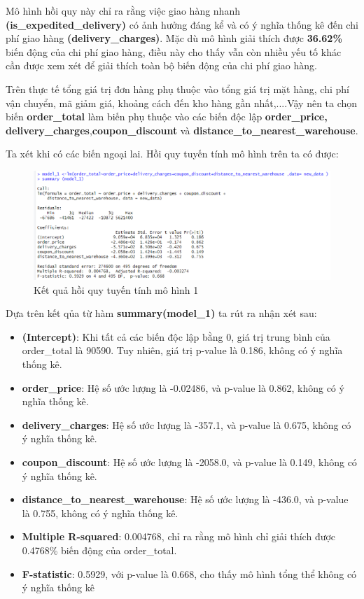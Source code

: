  Mô hình hồi quy này chỉ ra rằng việc giao hàng nhanh \textbf{(is\_expedited\_delivery)} có ảnh hưởng đáng kể và có ý nghĩa thống kê đến chi phí giao hàng \textbf{(delivery\_charges)}. Mặc dù mô hình giải thích được \textbf{36.62\%} biến động của chi phí giao hàng, điều này cho thấy vẫn còn nhiều yếu tố khác cần được xem xét để giải thích toàn bộ biến động của chi phí giao hàng.

Trên thực tế tổng giá trị đơn hàng phụ thuộc vào tổng giá trị mặt hàng, chi phí vận chuyển, mã giảm giá, khoảng cách đến kho hàng gần nhất,....Vậy nên ta chọn biến \textbf{order\_total} làm biến phụ thuộc vào các biến độc lập \textbf{order\_price, delivery\_charges},\textbf{coupon\_discount} và \textbf{distance\_to\_nearest\_warehouse}.

Ta xét khi có các biến ngoại lai. Hồi quy tuyến tính mô hình trên ta có được:
\begin{figure}[H]
  \centering
  \includegraphics[width=0.7\linewidth]{graphics/5.5.2.png}
  \caption{Kết quả hồi quy tuyến tính mô hình 1 }
\end{figure}

Dựa trên kết qủa từ hàm \textbf{summary(model\_1)} ta rút ra nhận xét sau:
\begin{itemize}
\item \textbf{(Intercept)}: Khi tất cả các biến độc lập bằng 0, giá trị trung bình của order\_total là 90590. Tuy nhiên, giá trị p-value là 0.186, không có ý nghĩa thống kê.
\item \textbf{order\_price}: Hệ số ước lượng là -0.02486, và p-value là 0.862, không có ý nghĩa thống kê.
\item \textbf{delivery\_charges}: Hệ số ước lượng là -357.1, và p-value là 0.675, không có ý nghĩa thống kê.
\item \textbf{coupon\_discount}: Hệ số ước lượng là -2058.0, và p-value là 0.149, không có ý nghĩa thống kê.
\item \textbf{distance\_to\_nearest\_warehouse}: Hệ số ước lượng là -436.0, và p-value là 0.755, không có ý nghĩa thống kê.
\item\textbf{Multiple R-squared}: 0.004768, chỉ ra rằng mô hình chỉ giải thích được 0.4768\% biến động của order\_total.
\item\textbf{F-statistic}: 0.5929, với p-value là 0.668, cho thấy mô hình tổng thể không có ý nghĩa thống kê
\end{itemize}

